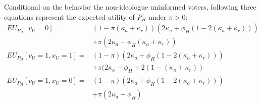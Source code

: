 \par Conditional on the behavior the non-ideologue uninformed voters, following three equations represent the expected utility of $P_H$ under $\pi > 0$:
\begin{align*}
EU_{P_H}[v_U = 0] =& (1-\pi (\kappa_{a} + \kappa_{r})) (2 \kappa_{a} + \phi_H (1- 2(\kappa_{a} + \kappa_{r}))) \\ &+\pi (2 \kappa_{a} - \phi_H (\kappa_{a} + \kappa_{r}))  \\
EU_{P_H}[v_U = 1, x_U = 1] =& (1-\pi) (2 \kappa_{a} + \phi_H (1- 2(\kappa_{a} + \kappa_{r})))  \\ &+ \pi (2 \kappa_{a} - \phi_H + 2 (1- (\kappa_{a} + \kappa_{r}))  \\
EU_{P_H}[v_U = 1, x_U = 0] =& (1-\pi) (2 \kappa_{a} + \phi_H (1- 2(\kappa_{a} + \kappa_{r})))  \\ &+ \pi (2 \kappa_{a} - \phi_H) 
\end{align*}

